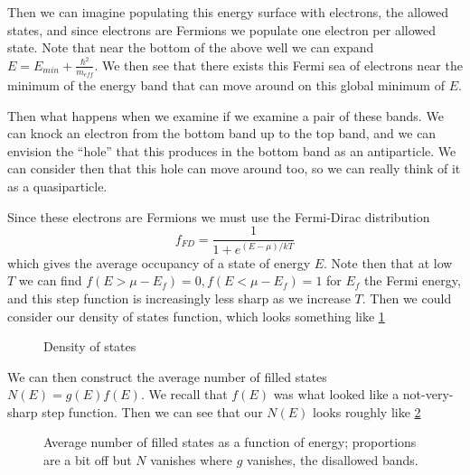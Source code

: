 \documentclass[10pt]{report}
\begin{document}
Then we can imagine populating this energy surface with electrons, the allowed states, and since electrons are Fermions we populate one electron per allowed state. Note that near the bottom of the above well we can expand $E = E_{min} + \frac{\hbar^2}{m_{eff}}$. We then see that there exists this Fermi sea of electrons near the minimum of the energy band that can move around on this global minimum of $E$.

Then what happens when we examine if we examine a pair of these bands. We can knock an electron from the bottom band up to the top band, and we can envision the ``hole'' that this produces in the bottom band as an antiparticle. We can consider then that this hole can move around too, so we can really think of it as a quasiparticle.

Since these electrons are Fermions we must use the Fermi-Dirac distribution
\begin{equation}
    f_{FD} = \frac{1}{1 + e^{(E- \mu)/kT}}
\end{equation}
which gives the average occupancy of a state of energy $E$. Note then that at low $T$ we can find $f(E > \mu - E_f) = 0, f(E < \mu - E_f) = 1$ for $E_f$ the Fermi energy, and this step function is increasingly less sharp as we increase $T$. Then we could consider our density of states function, which looks something like \ref{5.14.stateDensity}
\begin{figure}[!h]
    \centering
    \caption{Density of states}
    \label{5.14.stateDensity}
\end{figure}

We can then construct the average number of filled states $N(E) = g(E) f(E)$. We recall that $f(E)$ was what looked like a not-very-sharp step function. Then we can see that our $N(E)$ looks roughly like \ref{5.14.N}
\begin{figure}[!h]
    \centering
    \caption{Average number of filled states as a function of energy; proportions are a bit off but $N$ vanishes where $g$ vanishes, the disallowed bands.}
    \label{5.14.N}
\end{figure}
\end{document}
